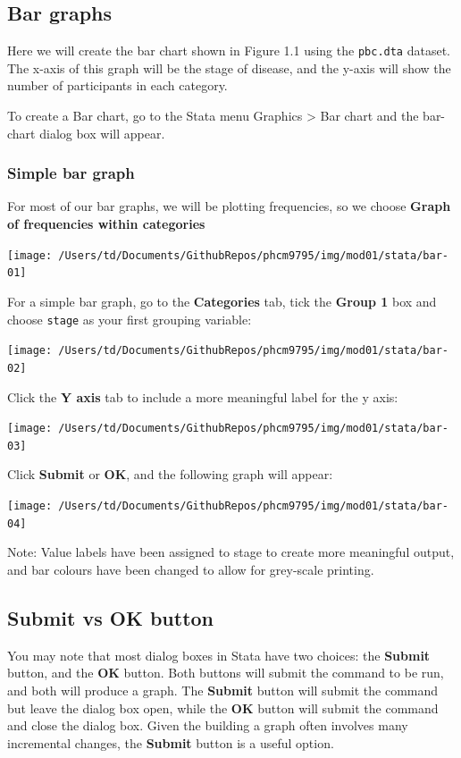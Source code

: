 \documentclass[
]{memoir}
\begin{document}
\hypertarget{bar-graphs-1}{%
\subsection{Bar graphs}\label{bar-graphs-1}}

Here we will create the bar chart shown in Figure 1.1 using the \texttt{pbc.dta} dataset. The x-axis of this graph will be the stage of disease, and the y-axis will show the number of participants in each category.

To create a Bar chart, go to the Stata menu Graphics \textgreater{} Bar chart and the bar-chart dialog box will appear.

\hypertarget{simple-bar-graph}{%
\subsubsection{Simple bar graph}\label{simple-bar-graph}}

For most of our bar graphs, we will be plotting frequencies, so we choose \textbf{Graph of frequencies within categories}

\texttt{[image: /Users/td/Documents/GithubRepos/phcm9795/img/mod01/stata/bar-01]}

For a simple bar graph, go to the \textbf{Categories} tab, tick the \textbf{Group 1} box and choose \texttt{stage} as your first grouping variable:

\texttt{[image: /Users/td/Documents/GithubRepos/phcm9795/img/mod01/stata/bar-02]}

Click the \textbf{Y axis} tab to include a more meaningful label for the y axis:

\texttt{[image: /Users/td/Documents/GithubRepos/phcm9795/img/mod01/stata/bar-03]}

Click \textbf{Submit} or \textbf{OK}, and the following graph will appear:

\texttt{[image: /Users/td/Documents/GithubRepos/phcm9795/img/mod01/stata/bar-04]}

Note: Value labels have been assigned to stage to create more meaningful output, and bar colours have been changed to allow for grey-scale printing.

\hypertarget{submit-vs-ok-button}{%
\subsection{Submit vs OK button}\label{submit-vs-ok-button}}

You may note that most dialog boxes in Stata have two choices: the \textbf{Submit} button, and the \textbf{OK} button. Both buttons will submit the command to be run, and both will produce a graph. The \textbf{Submit} button will submit the command but leave the dialog box open, while the \textbf{OK} button will submit the command and close the dialog box. Given the building a graph often involves many incremental changes, the \textbf{Submit} button is a useful option.
\end{document}
